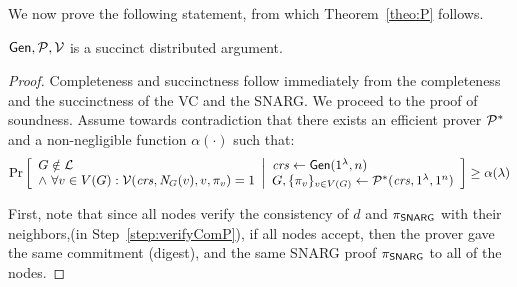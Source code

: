 We now prove the following statement, from which Theorem~\ref{theo:P} follows.
\begin{claim}
$\mathsf{Gen}, \mathcal{P}, \mathcal{V}$ is a succinct distributed argument.
\end{claim}

\begin{proof}%
    Completeness and succinctness follow immediately from the completeness and the succinctness of the VC and the SNARG. We proceed to the proof of soundness. 
    Assume towards contradiction that there exists an efficient prover $\mathcal{P}^*$ and a non-negligible function $\alpha(\cdot)$ such that:
    \begin{gather}\label{eq:soundnessBreakP}
        \underset{}{\text{Pr}}\left [
        \begin{array}{ll}
        G\notin \mathcal{L} \\
        \wedge\ \forall v\in V(G) : \mathcal{V}(\mathit{ crs }, \mathit{ N }_G(v), v, \pi_v) = 1
        \end{array}
        \middle\vert
        \begin{array}{ll}
        \mathit{ crs } \leftarrow \mathsf{Gen}(1^\lambda, n) \\
        G, \{\pi_{v}\}_{v\in V(G)} \leftarrow \mathcal{P}^*(\mathit{ crs }, 1^\lambda, 1^n) \\
        \end{array}
        \right ] \geq \alpha(\lambda)
    \end{gather}

    First, note that since all nodes verify the consistency of $d$ and $\pi_{\mathsf{SNARG}}$ with their neighbors,(in Step~\ref{step:verifyComP}), if all nodes accept, then the prover gave the same commitment (digest), and the same SNARG proof $\pi_{\mathsf{SNARG}}$ to all of the nodes.
    

\end{proof}

